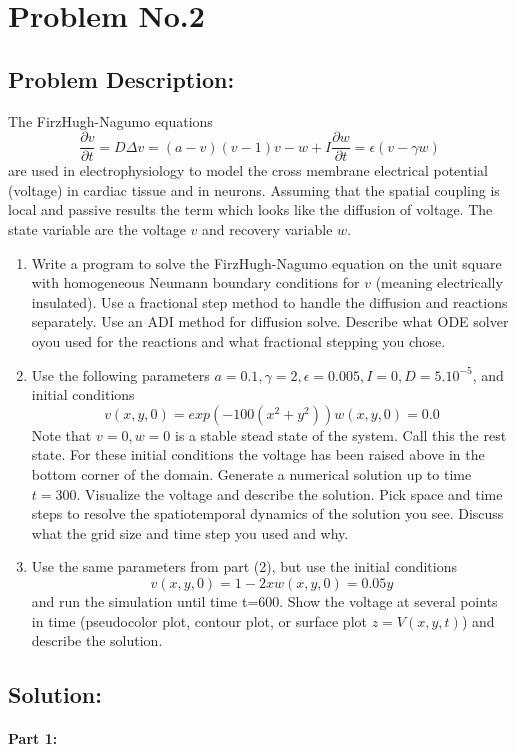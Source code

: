 \section{Problem No.2} \label{sec:prob2}
\subsection{Problem Description:} 
The FirzHugh-Nagumo equations 
$$
\frac{\partial v}{\partial t} = D\Delta v = (a-v)(v-1)v - w+I
\frac{\partial w}{\partial t} = \epsilon (v-\gamma w)
$$
are used in electrophysiology to model the cross membrane electrical potential (voltage) in cardiac tissue and in neurons. Assuming that the spatial coupling is local and passive results the term which looks like the diffusion of voltage. The state variable are the voltage $v$ and recovery variable $w$.
\begin{enumerate}
\item Write a program to solve the FirzHugh-Nagumo equation on the unit square with homogeneous Neumann boundary conditions for $v$ (meaning electrically insulated). Use a fractional step method to handle the diffusion and reactions separately. Use an ADI method for diffusion solve. Describe what ODE solver oyou used for the reactions and what fractional stepping you chose. 
\item Use the following parameters $a=0.1, \gamma =2, \epsilon=0.005, I=0, D=5.10^{-5}$, and initial conditions 
$$
v(x,y,0)=exp(-100(x^{2}+y^{2}))
w(x,y,0)=0.0
$$
Note that $v=0, w=0$ is a stable stead state of the system. Call this the rest state. For these initial conditions the voltage has been raised above in the bottom corner of the domain. Generate a numerical solution up to time $t=300$. Visualize the voltage and describe the solution. Pick space and time steps to resolve the spatiotemporal dynamics of the solution you see. Discuss what the grid size and time step you used and why. 
\item Use the same parameters from part (2), but use the initial conditions 
$$
v(x,y,0) = 1-2x
w(x,y,0) = 0.05y
$$
and run the simulation until time t=600. Show the voltage at several points in time (pseudocolor plot, contour plot, or surface plot $z=V(x,y,t)$) and describe the solution. 
\end{enumerate}
\subsection{Solution:}
\paragraph{Part 1:} 